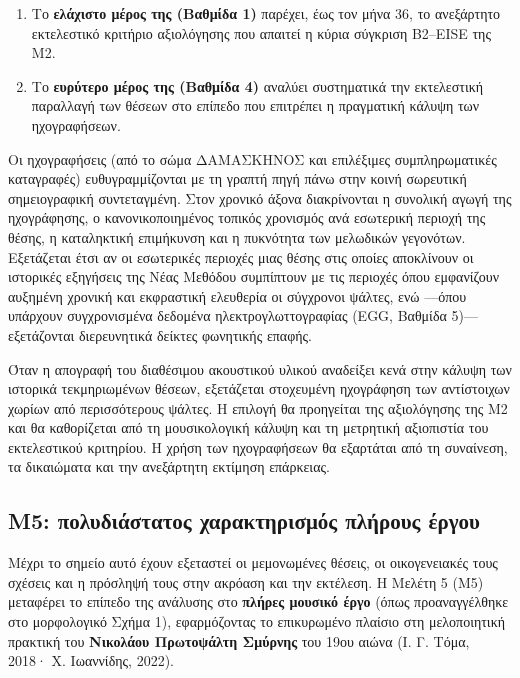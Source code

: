 \documentclass[11pt,a4paper]{article}
\begin{document}
\begin{enumerate}
\def\labelenumi{\arabic{enumi}.}
\item
  Το \textbf{ελάχιστο μέρος της (Βαθμίδα 1)} παρέχει, έως τον μήνα 36, το ανεξάρτητο εκτελεστικό κριτήριο αξιολόγησης που απαιτεί η κύρια σύγκριση B2--EISE της Μ2.
\item
  Το \textbf{ευρύτερο μέρος της (Βαθμίδα 4)} αναλύει συστηματικά την εκτελεστική παραλλαγή των θέσεων στο επίπεδο που επιτρέπει η πραγματική κάλυψη των ηχογραφήσεων.
\end{enumerate}

Οι ηχογραφήσεις (από το σώμα ΔΑΜΑΣΚΗΝΟΣ και επιλέξιμες συμπληρωματικές καταγραφές) ευθυγραμμίζονται με τη γραπτή πηγή πάνω στην κοινή σωρευτική σημειογραφική συντεταγμένη. Στον χρονικό άξονα διακρίνονται η συνολική αγωγή της ηχογράφησης, ο κανονικοποιημένος τοπικός χρονισμός ανά εσωτερική περιοχή της θέσης, η καταληκτική επιμήκυνση και η πυκνότητα των μελωδικών γεγονότων. Εξετάζεται έτσι αν οι εσωτερικές περιοχές μιας θέσης στις οποίες αποκλίνουν οι ιστορικές εξηγήσεις της Νέας Μεθόδου συμπίπτουν με τις περιοχές όπου εμφανίζουν αυξημένη χρονική και εκφραστική ελευθερία οι σύγχρονοι ψάλτες, ενώ ---όπου υπάρχουν συγχρονισμένα δεδομένα ηλεκτρογλωττογραφίας (EGG, Βαθμίδα 5)--- εξετάζονται διερευνητικά δείκτες φωνητικής επαφής.

Όταν η απογραφή του διαθέσιμου ακουστικού υλικού αναδείξει κενά στην κάλυψη των ιστορικά τεκμηριωμένων θέσεων, εξετάζεται στοχευμένη ηχογράφηση των αντίστοιχων χωρίων από περισσότερους ψάλτες. Η επιλογή θα προηγείται της αξιολόγησης της Μ2 και θα καθορίζεται από τη μουσικολογική κάλυψη και τη μετρητική αξιοπιστία του εκτελεστικού κριτηρίου. Η χρήση των ηχογραφήσεων θα εξαρτάται από τη συναίνεση, τα δικαιώματα και την ανεξάρτητη εκτίμηση επάρκειας.

\subsection{Μ5: πολυδιάστατος χαρακτηρισμός πλήρους έργου}\label{ux3bc5-ux3c0ux3bfux3bbux3c5ux3b4ux3b9ux3acux3c3ux3c4ux3b1ux3c4ux3bfux3c2-ux3c7ux3b1ux3c1ux3b1ux3baux3c4ux3b7ux3c1ux3b9ux3c3ux3bcux3ccux3c2-ux3c0ux3bbux3aeux3c1ux3bfux3c5ux3c2-ux3adux3c1ux3b3ux3bfux3c5}

Μέχρι το σημείο αυτό έχουν εξεταστεί οι μεμονωμένες θέσεις, οι οικογενειακές τους σχέσεις και η πρόσληψή τους στην ακρόαση και την εκτέλεση. Η Μελέτη 5 (Μ5) μεταφέρει το επίπεδο της ανάλυσης στο \textbf{πλήρες μουσικό έργο} (όπως προαναγγέλθηκε στο μορφολογικό Σχήμα 1), εφαρμόζοντας το επικυρωμένο πλαίσιο στη μελοποιητική πρακτική του \textbf{Νικολάου Πρωτοψάλτη Σμύρνης} του 19ου αιώνα (Ι. Γ. Τόμα, 2018· Χ. Ιωαννίδης, 2022).
\end{document}
